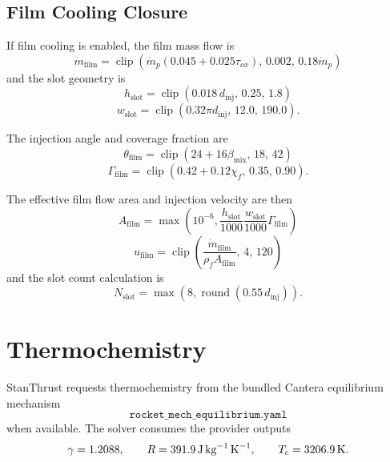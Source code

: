 \documentclass[11pt]{article}
\newcommand{\clip}{\operatorname{clip}}
\newcommand{\mdot}{\dot{m}}
\newcommand{\mdotp}{\dot{m}_{p}}
\begin{document}
\subsection{Film Cooling Closure}
If film cooling is enabled, the film mass flow is
\begin{equation}
\mdot_{\text{film}}
=
\clip\!\left(
\mdotp(0.045+0.025\tau_{ox}),
\,
0.002,\,
0.18\mdotp
\right)
\label{eq:film-mdot}
\end{equation}
and the slot geometry is
\begin{equation}
h_{\text{slot}}=\clip(0.018\,d_{\text{inj}},\,0.25,\,1.8)
\label{eq:film-height}
\end{equation}
\begin{equation}
w_{\text{slot}}=\clip(0.32\pi d_{\text{inj}},\,12.0,\,190.0).
\label{eq:film-width}
\end{equation}

The injection angle and coverage fraction are
\begin{equation}
\theta_{\text{film}}=\clip(24+16\beta_{\text{mix}},\,18,\,42)
\label{eq:film-angle}
\end{equation}
\begin{equation}
\Gamma_{\text{film}}=\clip(0.42+0.12\chi_f,\,0.35,\,0.90).
\label{eq:film-coverage}
\end{equation}

The effective film flow area and injection velocity are then
\begin{equation}
A_{\text{film}}=\max\!\left(10^{-6},\frac{h_{\text{slot}}}{1000}\frac{w_{\text{slot}}}{1000}\Gamma_{\text{film}}\right)
\label{eq:film-area}
\end{equation}
\begin{equation}
u_{\text{film}}
=
\clip\!\left(
\frac{\mdot_{\text{film}}}{\rho_f A_{\text{film}}},
\,
4,\,
120
\right)
\label{eq:film-velocity}
\end{equation}
and the slot count calculation is
\begin{equation}
N_{\text{slot}}=\max\!\left(8,\operatorname{round}(0.55\,d_{\text{inj}})\right).
\label{eq:film-slots}
\end{equation}

\section{Thermochemistry}
StanThrust requests thermochemistry from the bundled Cantera equilibrium mechanism
\[
\texttt{rocket\_mech\_equilibrium.yaml}
\]
when available. The solver consumes the provider outputs
\[
\gamma=1.2088,\qquad
R=\SI{391.9}{J\,kg^{-1}\,K^{-1}},\qquad
T_c=\SI{3206.9}{K}.
\]
\end{document}
